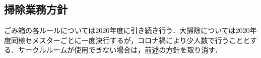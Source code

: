\subsection*{掃除業務方針}


ごみ箱の各ルールについては2020年度に引き続き行う．大掃除については2020年度同様セメスターごとに一度決行するが，コロナ禍により少人数で行うこととする．サークルルームが使用できない場合は，前述の方針を取り消す．

